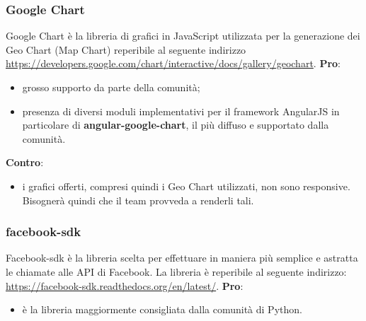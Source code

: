 		\subsubsection{Google Chart} %
		\label{ssub:google_chart}
		Google Chart è la libreria di grafici in JavaScript utilizzata per la generazione dei Geo Chart (Map Chart) reperibile al seguente indirizzo \url{https://developers.google.com/chart/interactive/docs/gallery/geochart}. \newline
		\textbf{Pro}:
			\begin{itemize}
				\item grosso supporto da parte della comunità;
				\item presenza di diversi moduli implementativi per il framework AngularJS in particolare di \textbf{angular-google-chart}, il più diffuso e supportato dalla comunità.
			\end{itemize}
		\noindent
		\textbf{Contro}:
			\begin{itemize}
				\item i grafici offerti, compresi quindi i Geo Chart utilizzati, non sono responsive. Bisognerà quindi che il team provveda a renderli tali.
			\end{itemize}


		\subsubsection{facebook-sdk} %
		\label{ssub:facebook_sdk}
		Facebook-sdk è la libreria scelta per effettuare in maniera più semplice e astratta le chiamate alle API di Facebook. La libreria è reperibile al seguente indirizzo: \url{https://facebook-sdk.readthedocs.org/en/latest/}. \newline
		\textbf{Pro}:
			\begin{itemize}
				\item è la libreria maggiormente consigliata dalla comunità di Python.
			\end{itemize}


